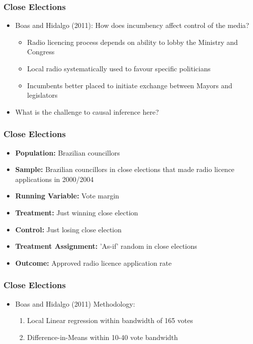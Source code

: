 \documentclass[xcolor=x11names,compress]{beamer}\usepackage[]{graphicx}\usepackage[]{color}
\renewcommand{\(}{\begin{columns}}
\renewcommand{\)}{\end{columns}}
\newcommand{\<}[1]{\begin{column}{#1}}
\renewcommand{\>}{\end{column}}
\begin{document}
\begin{frame}
\frametitle{Close Elections}
\begin{itemize}
\item Boas and Hidalgo (2011): How does incumbency affect control of the media?
\pause
\begin{itemize}
\item Radio licencing process depends on ability to lobby the Ministry and Congress
\pause
\item Local radio systematically used to favour specific politicians
\pause
\item Incumbents better placed to initiate exchange between Mayors and legislators
\pause
\end{itemize}
\item What is the challenge to causal inference here?
\end{itemize}
\end{frame}

\begin{frame}
\frametitle{Close Elections}
\begin{itemize}
\item \textbf{Population:} Brazilian councillors
\item \textbf{Sample:} Brazilian councillors in close elections that made radio licence applications in 2000/2004
\item \textbf{Running Variable:} Vote margin
\item \textbf{Treatment:} Just winning close election
\item \textbf{Control:} Just losing close election
\item \textbf{Treatment Assignment:} 'As-if' random in close elections
\item \textbf{Outcome:} Approved radio licence application rate
\end{itemize}
\end{frame}

\begin{frame}
\frametitle{Close Elections}
\begin{itemize}
\item Boas and Hidalgo (2011) Methodology:
\begin{enumerate}
\item Local Linear regression within bandwidth of 165 votes
\item Difference-in-Means within 10-40 vote bandwidth
\end{enumerate}
\end{itemize}
\end{frame}
\end{document}
